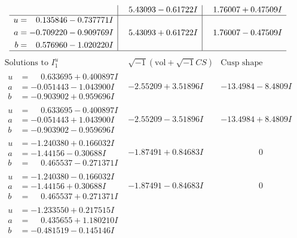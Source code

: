 \documentclass[1p]{elsarticle_modified}
\theoremstyle{definition}
\newcommand{\I}{\sqrt{-1}}
\begin{document}
$$\begin{array}{c|c|c}
 & \phantom{-}5.43093 - 0.61722 I & \phantom{-}1.76007 + 0.47509 I \\ \hline\begin{aligned}
u &= \phantom{-}0.135846 - 0.737771 I \\
a &= -0.709220 - 0.909769 I \\
b &= \phantom{-}0.576960 - 1.020220 I\end{aligned}
 & \phantom{-}5.43093 + 0.61722 I & \phantom{-}1.76007 - 0.47509 I\\
 \hline 
 \end{array}$$\newpage$$\begin{array}{c|c|c}  
\text{Solutions to }I^u_{1}& \I (\text{vol} + \sqrt{-1}CS) & \text{Cusp shape}\\
 \hline 
\begin{aligned}
u &= \phantom{-}0.633695 + 0.400897 I \\
a &= -0.051443 - 1.043900 I \\
b &= -0.903902 + 0.959696 I\end{aligned}
 & -2.55209 + 3.51896 I & -13.4984 - 8.4809 I \\ \hline\begin{aligned}
u &= \phantom{-}0.633695 - 0.400897 I \\
a &= -0.051443 + 1.043900 I \\
b &= -0.903902 - 0.959696 I\end{aligned}
 & -2.55209 - 3.51896 I & -13.4984 + 8.4809 I \\ \hline\begin{aligned}
u &= -1.240380 + 0.166032 I \\
a &= -1.44156 - 0.30688 I \\
b &= \phantom{-}0.465537 - 0.271371 I\end{aligned}
 & -1.87491 + 0.84683 I & \phantom{-0.000000 } 0 \\ \hline\begin{aligned}
u &= -1.240380 - 0.166032 I \\
a &= -1.44156 + 0.30688 I \\
b &= \phantom{-}0.465537 + 0.271371 I\end{aligned}
 & -1.87491 - 0.84683 I & \phantom{-0.000000 } 0 \\ \hline\begin{aligned}
u &= -1.233550 + 0.217515 I \\
a &= \phantom{-}0.435655 + 1.180210 I \\
b &= -0.481519 - 0.145146 I\end{aligned}

\end{array}$$
\end{document}
